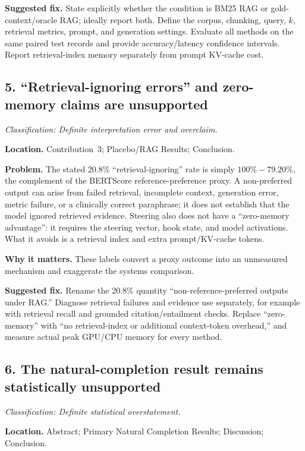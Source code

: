 \documentclass[11pt]{article}
\newcommand{\findinglabel}[1]{\textbf{#1}}
\newcommand{\classification}[1]{\textit{Classification: #1.}}
\begin{document}
\findinglabel{Suggested fix.} State explicitly whether the condition is BM25 RAG or gold-context/oracle RAG; ideally report both.  Define the corpus, chunking, query, $k$, retrieval metrics, prompt, and generation settings.  Evaluate all methods on the same paired test records and provide accuracy/latency confidence intervals.  Report retrieval-index memory separately from prompt KV-cache cost.

\subsection*{5. ``Retrieval-ignoring errors'' and zero-memory claims are unsupported}

\classification{Definite interpretation error and overclaim}

\findinglabel{Location.} Contribution~3; Placebo/RAG Results; Conclusion.

\findinglabel{Problem.} The stated 20.8\% ``retrieval-ignoring'' rate is simply $100\%-79.20\%$, the complement of the BERTScore reference-preference proxy.  A non-preferred output can arise from failed retrieval, incomplete context, generation error, metric failure, or a clinically correct paraphrase; it does not establish that the model ignored retrieved evidence.  Steering also does not have a ``zero-memory advantage'': it requires the steering vector, hook state, and model activations.  What it avoids is a retrieval index and extra prompt/KV-cache tokens.

\findinglabel{Why it matters.} These labels convert a proxy outcome into an unmeasured mechanism and exaggerate the systems comparison.

\findinglabel{Suggested fix.} Rename the 20.8\% quantity ``non-reference-preferred outputs under RAG.''  Diagnose retrieval failures and evidence use separately, for example with retrieval recall and grounded citation/entailment checks.  Replace ``zero-memory'' with ``no retrieval-index or additional context-token overhead,'' and measure actual peak GPU/CPU memory for every method.

\subsection*{6. The natural-completion result remains statistically unsupported}

\classification{Definite statistical overstatement}

\findinglabel{Location.} Abstract; Primary Natural Completion Results; Discussion; Conclusion.
\end{document}
